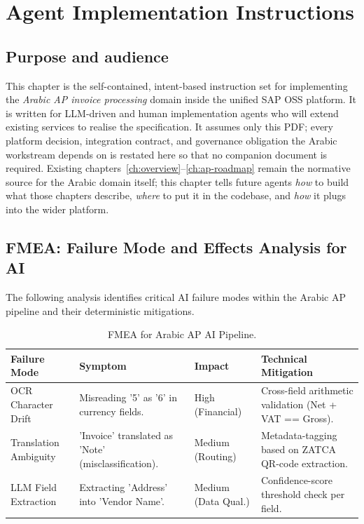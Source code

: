 \chapter{Agent Implementation Instructions}\label{ch:agent-impl}

\section{Purpose and audience}
This chapter is the self-contained, intent-based instruction set for
implementing the \emph{Arabic AP invoice processing} domain inside the
unified SAP OSS platform. It is written for LLM-driven and human
implementation agents who will extend existing services to realise the
specification. It assumes only this PDF; every platform decision,
integration contract, and governance obligation the Arabic workstream
depends on is restated here so that no companion document is required.
Existing chapters~\ref{ch:overview}--\ref{ch:ap-roadmap} remain the
normative source for the Arabic domain itself; this chapter tells
future agents \emph{how} to build what those chapters describe,
\emph{where} to put it in the codebase, and \emph{how} it plugs into
the wider platform.



\section{FMEA: Failure Mode and Effects Analysis for AI}
\label{sec:fmea-ai}

The following analysis identifies critical AI failure modes within the Arabic AP pipeline and their deterministic mitigations.

\begin{table}[htbp]
\centering
\footnotesize
\caption{FMEA for Arabic AP AI Pipeline.}
\label{tab:arabic-fmea}
\begin{tabularx}{\textwidth}{@{}l X X X@{}}
\toprule
\textbf{Failure Mode} & \textbf{Symptom} & \textbf{Impact} & \textbf{Technical Mitigation} \\
\midrule
OCR Character Drift & Misreading '5' as '6' in currency fields. & High (Financial) & Cross-field arithmetic validation (Net + VAT == Gross). \\
Translation Ambiguity & 'Invoice' translated as 'Note' (misclassification). & Medium (Routing) & Metadata-tagging based on ZATCA QR-code extraction. \\
LLM Field Extraction & Extracting 'Address' into 'Vendor Name'. & Medium (Data Qual.) & Confidence-score threshold check per field. \\
\bottomrule
\end{tabularx}
\end{table}

